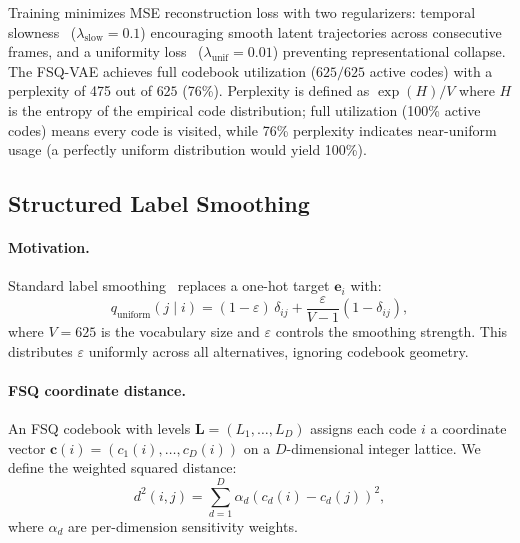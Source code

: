\documentclass{article}
\newcommand{\vocabsize}{625}
\begin{document}
Training minimizes MSE reconstruction loss with two regularizers: temporal slowness~\citep{huh2023grwm} ($\lambda_\text{slow} = 0.1$) encouraging smooth latent trajectories across consecutive frames, and a uniformity loss~\citep{wang2020uniformity} ($\lambda_\text{unif} = 0.01$) preventing representational collapse.
The FSQ-VAE achieves full codebook utilization ($\vocabsize / \vocabsize$ active codes) with a perplexity of 475 out of $\vocabsize$ (76\%). Perplexity is defined as $\exp(H) / V$ where $H$ is the entropy of the empirical code distribution; full utilization (100\% active codes) means every code is visited, while 76\% perplexity indicates near-uniform usage (a perfectly uniform distribution would yield 100\%).

\subsection{Structured Label Smoothing}
\label{sec:sls}

\paragraph{Motivation.}
Standard label smoothing~\citep{szegedy2016rethinking} replaces a one-hot target $\mathbf{e}_i$ with:
\begin{equation}
  q_\text{uniform}(j \mid i) = (1 - \varepsilon)\,\delta_{ij} + \frac{\varepsilon}{V - 1}(1 - \delta_{ij}),
  \label{eq:uniform_ls}
\end{equation}
where $V = \vocabsize$ is the vocabulary size and $\varepsilon$ controls the smoothing strength.
This distributes $\varepsilon$ uniformly across all alternatives, ignoring codebook geometry.

\paragraph{FSQ coordinate distance.}
An FSQ codebook with levels $\mathbf{L} = (L_1, \dots, L_D)$ assigns each code $i$ a coordinate vector $\mathbf{c}(i) = (c_1(i), \dots, c_D(i))$ on a $D$-dimensional integer lattice.
We define the weighted squared distance:
\begin{equation}
  d^2(i, j) = \sum_{d=1}^{D} \alpha_d \left( c_d(i) - c_d(j) \right)^2,
  \label{eq:fsq_dist}
\end{equation}
where $\alpha_d$ are per-dimension sensitivity weights.
\end{document}
